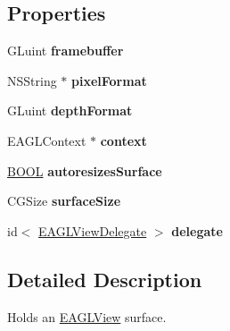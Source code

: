 \subsection*{Properties}
\begin{DoxyCompactItemize}
\item 
\hypertarget{interface_e_a_g_l_view_a6f148e4b97d6e104349d8f3bbfac8fb9}{G\+Luint {\bfseries framebuffer}}\label{interface_e_a_g_l_view_a6f148e4b97d6e104349d8f3bbfac8fb9}

\item 
\hypertarget{interface_e_a_g_l_view_a12371844debc257c72584b728139cae5}{N\+S\+String $\ast$ {\bfseries pixel\+Format}}\label{interface_e_a_g_l_view_a12371844debc257c72584b728139cae5}

\item 
\hypertarget{interface_e_a_g_l_view_a67da44fe0a997c08431d56f4ed66a5f1}{G\+Luint {\bfseries depth\+Format}}\label{interface_e_a_g_l_view_a67da44fe0a997c08431d56f4ed66a5f1}

\item 
\hypertarget{interface_e_a_g_l_view_a5a11b0e5b21de25c1bf0abbbe0da671e}{E\+A\+G\+L\+Context $\ast$ {\bfseries context}}\label{interface_e_a_g_l_view_a5a11b0e5b21de25c1bf0abbbe0da671e}

\item 
\hypertarget{interface_e_a_g_l_view_a40b2efdb8bd6e5dd3ad25e9947f8d98c}{\hyperlink{_ice_types_8h_a050c65e107f0c828f856a231f4b4e788}{B\+O\+O\+L} {\bfseries autoresizes\+Surface}}\label{interface_e_a_g_l_view_a40b2efdb8bd6e5dd3ad25e9947f8d98c}

\item 
\hypertarget{interface_e_a_g_l_view_af2b7c1ee33b45aac21ec34c5023b5234}{C\+G\+Size {\bfseries surface\+Size}}\label{interface_e_a_g_l_view_af2b7c1ee33b45aac21ec34c5023b5234}

\item 
\hypertarget{interface_e_a_g_l_view_af36ad8e63652e94fcfb368ad145deb51}{id$<$ \hyperlink{protocol_e_a_g_l_view_delegate-p}{E\+A\+G\+L\+View\+Delegate} $>$ {\bfseries delegate}}\label{interface_e_a_g_l_view_af36ad8e63652e94fcfb368ad145deb51}

\end{DoxyCompactItemize}


\subsection{Detailed Description}
Holds an \hyperlink{interface_e_a_g_l_view}{E\+A\+G\+L\+View} surface. 

